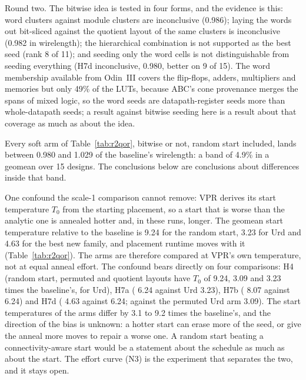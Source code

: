 Round two. The bitwise idea is tested in four forms, and the evidence is this: word clusters
against module clusters are inconclusive (0.986); laying the words out bit-sliced against the quotient layout of the same
clusters is inconclusive (0.982 in wirelength); the hierarchical
combination is not supported as the best seed (rank 8 of 11); and seeding only the
word cells is not distinguishable from seeding everything (H7d inconclusive, 0.980, better on 9 of 15). The word
membership available from Odin~III covers the flip-flops, adders, multipliers and memories but only
49\% of the LUTs, because ABC's cone provenance merges the spans of
mixed logic, so the word seeds are datapath-register seeds more than whole-datapath seeds; a result
against bitwise seeding here is a result about that coverage as much as about the idea.

Every soft arm of Table~\ref{tab:r2qor}, bitwise or not, random start included, lands between 0.980 and
1.029 of the baseline's wirelength: a band of 4.9\% in a geomean over
15 designs. The conclusions below are conclusions about differences inside that band.

One confound the scale-1 comparison cannot remove: VPR derives its start temperature $T_0$ from the starting
placement, so a start that is worse than the analytic one is annealed hotter and, in these runs, longer. The
geomean start temperature relative to the baseline is 9.24 for the random start,
3.23 for Urd and 4.63 for the best new family, and placement runtime moves with it
(Table~\ref{tab:r2qor}). The arms are therefore compared at VPR's own temperature, not at equal anneal effort. The confound
bears directly on four comparisons: H4 (random start, permuted and quotient layouts have $T_0$ of 9.24, 3.09 and 3.23 times the baseline's, for Urd),
H7a ( 6.24 against Urd 3.23), H7b ( 8.07 against  6.24) and H7d
( 4.63 against  6.24; against the permuted Urd arm 3.09). The start temperatures
of the arms differ by 3.1 to 9.2 times the baseline's, and the direction of the bias is unknown: a hotter
start can erase more of the seed, or give the anneal more moves to repair a worse one. A random start beating a connectivity-aware start
would be a statement about the schedule as much as about the start. The effort curve (N3) is the experiment that separates the two, and it stays open.

